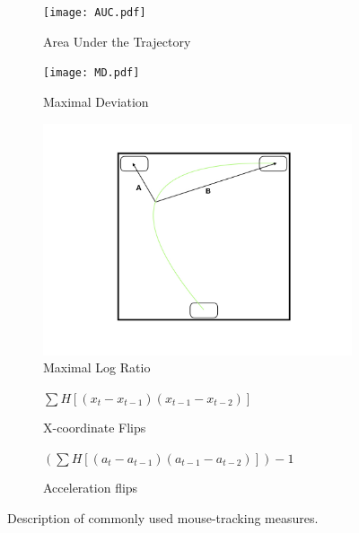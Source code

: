 \documentclass[draft]{article}
\begin{document}
\begin{figure}[h]
\centering
\begin{subfigure}[b]{0.3\textwidth}
\texttt{[image: AUC.pdf]}
\caption{Area Under the Trajectory}
\end{subfigure}
%
\begin{subfigure}[b]{0.3\textwidth}
\texttt{[image: MD.pdf]}
\caption{Maximal Deviation}
\end{subfigure}
%
\begin{subfigure}[b]{0.3\textwidth}
\includegraphics[width=\textwidth]{MaxRatio.jpeg}
\caption{Maximal Log Ratio}
\end{subfigure}
\vspace{.5cm}

\begin{subfigure}[b]{0.45\textwidth}
\caption{X-coordinate Flips}
\centering
\(\sum H[(x_{t} - x_{t-1})(x_{t-1} - x_{t-2})] \)
\end{subfigure}
%
\begin{subfigure}[b]{0.45\textwidth}
\caption{Acceleration flips}
\centering
\((\sum H[( a_{t} - a_{t-1})( a_{t-1} - a_{t-2})])-1 \)

\end{subfigure}

\caption{Description of commonly used mouse-tracking measures.}
\label{fig:traditional-measures}

\end{figure}
\end{document}
